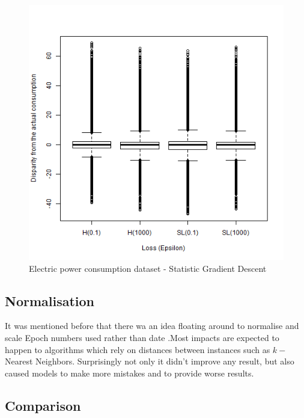 \begin{figure}[p]
	\center
	\includegraphics[scale=\figurescaling]{figures/db3/SGD.png}
	\caption{Electric power consumption dataset - Statistic Gradient Descent}
	\label{ypmsd:fig:db3:sgdresults}
\end{figure}


\subsection{Normalisation}
It was mentioned before that there wa an idea floating around to normalise
and scale Epoch numbers used rather than date .Most impacts are
expected to happen to algorithms which rely on distances between instances such
as $k-$Nearest Neighbors. Surprisingly not only it didn't
improve any result, but also caused models to make more mistakes and to provide
worse results.

\subsection{Comparison}

